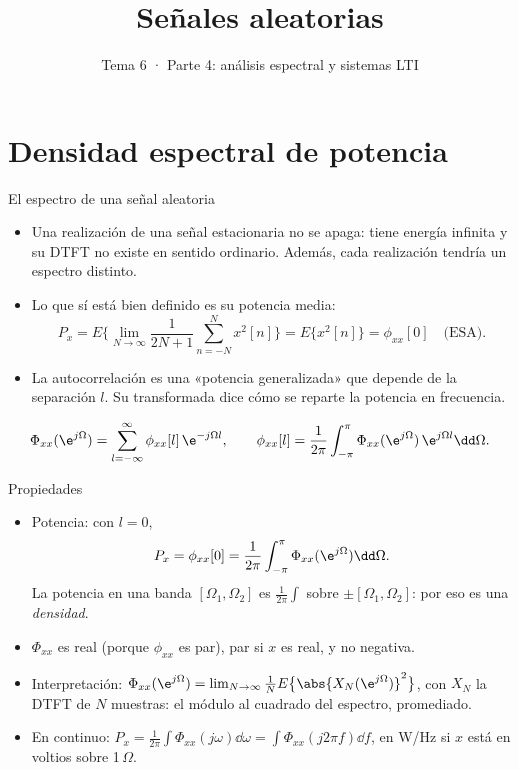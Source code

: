 \documentclass[aspectratio=169,11pt]{beamer}
\title[T6 · Análisis espectral]{Señales aleatorias}
\subtitle{Tema 6 · Parte 4: análisis espectral y sistemas LTI}
\begin{document}
\portada

\section{Densidad espectral de potencia}

\begin{frame}{El espectro de una señal aleatoria}
  \small
  \begin{itemize}
    \item Una realización de una señal estacionaria no se apaga: tiene energía infinita y su DTFT no existe en sentido ordinario. Además, cada realización tendría un espectro distinto.
    \item Lo que sí está bien definido es su \alert{potencia} media:
    \[
      P_x=E\Big\{\lim_{N\to\infty}\frac1{2N+1}\sum_{n=-N}^Nx^2[n]\Big\}=E\{x^2[n]\}=\phi_{xx}[0]\quad\text{(ESA)}.
    \]
    \item La autocorrelación es una «potencia generalizada» que depende de la separación $l$. Su transformada dice cómo se reparte la potencia en frecuencia.
  \end{itemize}
  \begin{definicion}
    \[
      \Phi_{xx}(\e^{j\Omega})=\sum_{l=-\infty}^{\infty}\phi_{xx}[l]\,\e^{-j\Omega l},\qquad
      \phi_{xx}[l]=\frac1{2\pi}\int_{-\pi}^{\pi}\Phi_{xx}(\e^{j\Omega})\,\e^{j\Omega l}\dd\Omega .
    \]
  \end{definicion}
\end{frame}

\begin{frame}{Propiedades}
  \small
  \begin{itemize}
    \item \alert{Potencia}: con $l=0$,
    \[
      P_x=\phi_{xx}[0]=\frac1{2\pi}\int_{-\pi}^{\pi}\Phi_{xx}(\e^{j\Omega})\dd\Omega .
    \]
    La potencia en una banda $[\Omega_1,\Omega_2]$ es $\frac1{2\pi}\int$ sobre $\pm[\Omega_1,\Omega_2]$: por eso es una \emph{densidad}.
    \item $\Phi_{xx}$ es \alert{real} (porque $\phi_{xx}$ es par), \alert{par} si $x$ es real, y \alert{no negativa}.
    \item Interpretación: $\Phi_{xx}(\e^{j\Omega})=\lim_{N\to\infty}\frac1{N}E\big\{\abs{X_N(\e^{j\Omega})}^2\big\}$, con $X_N$ la DTFT de $N$ muestras: el módulo al cuadrado del espectro, promediado.
    \item En continuo: $P_x=\frac1{2\pi}\int\Phi_{xx}(j\omega)\dd\omega=\int\Phi_{xx}(j2\pi f)\dd f$, en W/Hz si $x$ está en voltios sobre 1\,$\Omega$.
  \end{itemize}
\end{frame}
\end{document}
